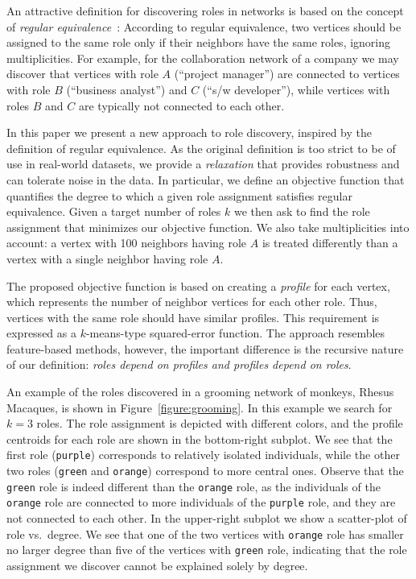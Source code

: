 An attractive definition for 
discovering roles in networks is based on the concept of
\emph{regular equivalence}~\cite{everett1994regular,white1983graph}:
According to regular equivalence, 
two vertices should be assigned to the same role
only if their neighbors have the same roles, ignoring multiplicities.
For example, 
for the collaboration network of a company
we may discover 
that vertices with role $A$ (``project manager'')
are connected to vertices with role 
$B$ (``business analyst'') and $C$ (``s/w developer''), 
while vertices with roles $B$ and $C$ are typically not connected to each other. 

In this paper we present a new approach to role discovery, 
inspired by the definition of regular equivalence.
As the original definition is too strict to be of use in real-world datasets, 
we provide a \emph{relaxation} that provides robustness and can tolerate noise in the data.
In particular, we define an objective function that quantifies
the degree to which a given role assignment 
satisfies regular equivalence.
Given a target number of roles $k$
we then ask to find the role assignment that minimizes our objective function.
We also take multiplicities into account: a vertex with 100 neighbors having role $A$
is treated differently than a vertex with a single neighbor having role $A$.



The proposed objective function is based on creating a \emph{profile} for each vertex, 
which represents the number of neighbor vertices for each other role.
Thus, vertices with the same role should have similar profiles.
This requirement is expressed as a $k$-means-type squared-error function. 
The approach resembles feature-based methods,
however, the important difference is the recursive nature of our definition: 
\emph{roles depend on profiles and profiles depend on roles}. 

An example of the roles discovered in a grooming network
of monkeys, Rhesus Macaques, 
is shown in Figure~\ref{figure:grooming}. 
In this example we search for $k=3$ roles. 
The role assignment is depicted with different colors, 
and the profile centroids for each role are shown in the bottom-right subplot.
We see that the first role ({\tt purple}) corresponds to relatively isolated individuals, 
while the other two roles ({\tt green} and {\tt orange}) correspond to more central ones. 
Observe that the {\tt green} role is indeed different than the {\tt orange} role,
as the individuals of the {\tt orange} role are connected to more individuals of the {\tt purple} role, 
and they are not connected to each other. 
In the upper-right subplot we show a scatter-plot of role vs.\ degree. 
We see that one of the two vertices with {\tt orange} role
has smaller no larger degree than five of the vertices with {\tt green} role, 
indicating that the role assignment we discover cannot be explained solely by degree. 


